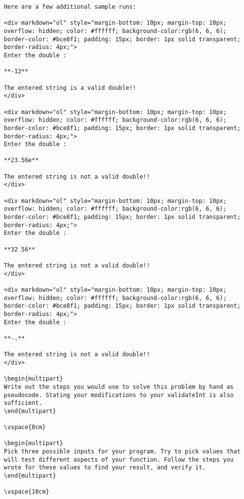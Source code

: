 \begin{problem}
\begin{verbatim}
Here are a few additional sample runs:

<div markdown="ol" style="margin-bottom: 10px; margin-top: 10px; overflow: hidden; color: #ffffff; background-color:rgb(6, 6, 6); border-color: #bce8f1; padding: 15px; border: 1px solid transparent; border-radius: 4px;">
Enter the double :

**-12**

The entered string is a valid double!!
</div>

<div markdown="ol" style="margin-bottom: 10px; margin-top: 10px; overflow: hidden; color: #ffffff; background-color:rgb(6, 6, 6); border-color: #bce8f1; padding: 15px; border: 1px solid transparent; border-radius: 4px;">
Enter the double :

**23.56e**

The entered string is not a valid double!!
</div>

<div markdown="ol" style="margin-bottom: 10px; margin-top: 10px; overflow: hidden; color: #ffffff; background-color:rgb(6, 6, 6); border-color: #bce8f1; padding: 15px; border: 1px solid transparent; border-radius: 4px;">
Enter the double :

**32 56**

The entered string is not a valid double!!
</div>

<div markdown="ol" style="margin-bottom: 10px; margin-top: 10px; overflow: hidden; color: #ffffff; background-color:rgb(6, 6, 6); border-color: #bce8f1; padding: 15px; border: 1px solid transparent; border-radius: 4px;">
Enter the double :

**-.**

The entered string is not a valid double!!
</div>

\begin{multipart}
Write out the steps you would use to solve this problem by hand as pseudocode. Stating your modifications to your validateInt is also sufficient.
\end{multipart}

\vspace{8cm}

\begin{multipart}
Pick three possible inputs for your program. Try to pick values that will test different aspects of your function. Follow the steps you wrote for these values to find your result, and verify it.
\end{multipart}

\vspace{10cm}


\end{verbatim}
\end{problem}
